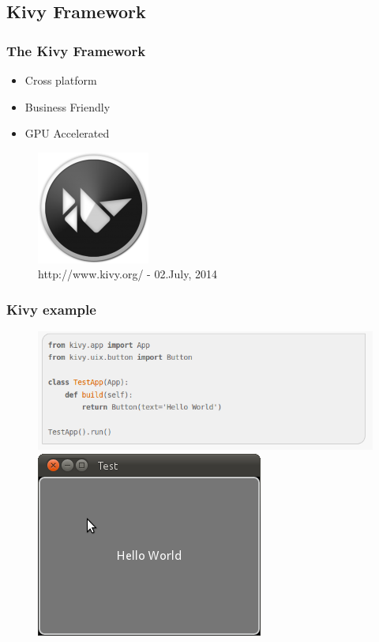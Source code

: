\documentclass[9pt]{beamer}
\begin{document}
		\subsection{Kivy Framework}
			\begin{frame}
				\frametitle{The Kivy Framework}
				\begin{itemize}
					\item Cross platform
					\item Business Friendly
					\item GPU Accelerated
				\end{itemize}
				
				\begin{figure}
					\centering				
					\includegraphics[scale=0.3]{Images/kivy_logo.png}
					\caption{http://www.kivy.org/ - 02.July, 2014}
				\end{figure}
			\end{frame}
			
			\begin{frame}
				\frametitle{Kivy example}
				\begin{figure}
				\centering
				\includegraphics[scale=0.3]{Images/kivy_helloworld_code.png}
				\includegraphics[scale=0.3]{Images/kivy_helloworld_result.png}
				\end{figure}
			\end{frame}
			
\end{document}
